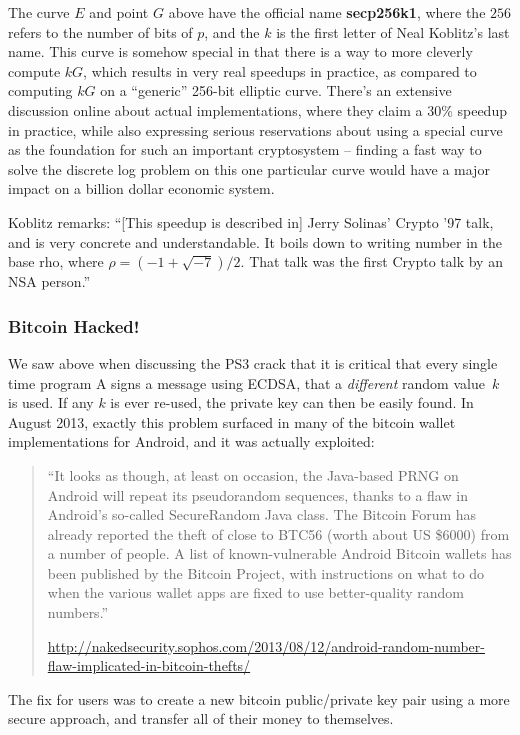 \documentclass{book}
\begin{document}
The curve $E$ and point $G$ above have the official name {\bf secp256k1}, where the
$256$ refers to the number of bits of $p$, and the $k$ is the first
letter of Neal Koblitz's last name.
This curve is somehow special in that there is a way to more cleverly compute
$kG$, which results in very real speedups in practice, as compared
to computing $kG$ on a ``generic'' 256-bit elliptic curve.  There's
an extensive discussion online about actual implementations, where
they claim a 30\% speedup in practice, while also expressing serious
reservations about using a special curve as the foundation for such
an important cryptosystem -- finding a fast way to solve the discrete
log problem on this one particular curve would have a major impact
on a billion dollar economic system.

Koblitz remarks:  ``[This speedup is described in]
Jerry Solinas' Crypto '97 talk, and is very concrete
and understandable.  It boils down to writing number in the base rho,
where $\rho=(-1+\sqrt{-7})/2$.  That talk was the first Crypto talk by an
NSA person.''


\subsubsection{Bitcoin Hacked!}
We saw above when discussing the PS3 crack that
it is critical that every single time program A signs a message
using ECDSA, that a {\em different} random value~$k$ is used.
If any $k$ is ever re-used, the private key can then be easily found.
In August 2013, exactly this problem surfaced in many of the bitcoin wallet
implementations for Android, and it was actually exploited:
\begin{quote}
``It looks as though, at least on occasion, the Java-based PRNG on Android will repeat its pseudorandom sequences, thanks to a flaw in Android's so-called SecureRandom Java class.  The Bitcoin Forum has already reported the theft of close to BTC56 (worth about US \$6000) from a number of people. A list of known-vulnerable Android Bitcoin wallets has been published by the Bitcoin Project, with instructions on what to do when the various wallet apps are fixed to use better-quality random numbers.''

\url{http://nakedsecurity.sophos.com/2013/08/12/android-random-number-flaw-implicated-in-bitcoin-thefts/}
\end{quote}

The fix for users was to create a new bitcoin public/private key pair using
a more secure approach, and transfer all of their money to themselves.
\end{document}
